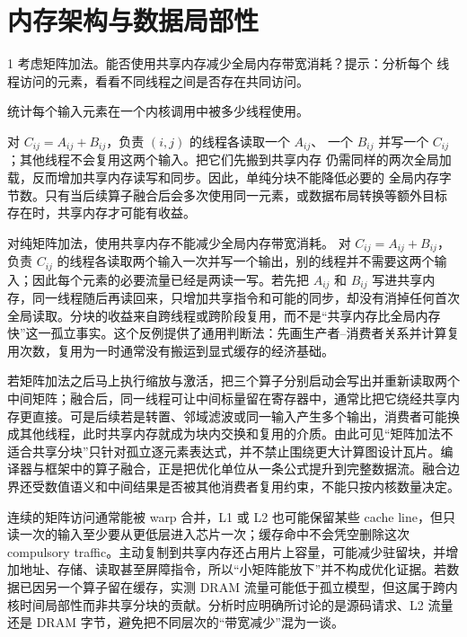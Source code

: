 \chapter{内存架构与数据局部性}

\begin{solutionexercise}{1}
\problemheading 考虑矩阵加法。能否使用共享内存减少全局内存带宽消耗？提示：分析每个
线程访问的元素，看看不同线程之间是否存在共同访问。

\approachheading 统计每个输入元素在一个内核调用中被多少线程使用。

\answerheading 对 $C_{ij}=A_{ij}+B_{ij}$，负责 $(i,j)$ 的线程各读取一个 $A_{ij}$、
一个 $B_{ij}$ 并写一个 $C_{ij}$；其他线程不会复用这两个输入。把它们先搬到共享内存
仍需同样的两次全局加载，反而增加共享内存读写和同步。因此，单纯分块不能降低必要的
全局内存字节数。只有当后续算子融合后会多次使用同一元素，或数据布局转换等额外目标
存在时，共享内存才可能有收益。

\conclusionheading 对纯矩阵加法，使用共享内存不能减少全局内存带宽消耗。
\discussionheading
{}
对 $C_{ij}=A_{ij}+B_{ij}$，负责 $C_{ij}$ 的线程各读取两个输入一次并写一个输出，别的线程并不需要这两个输入；因此每个元素的必要流量已经是两读一写。若先把 $A_{ij}$ 和 $B_{ij}$ 写进共享内存，同一线程随后再读回来，只增加共享指令和可能的同步，却没有消掉任何首次全局读取。分块的收益来自跨线程或跨阶段复用，而不是“共享内存比全局内存快”这一孤立事实。这个反例提供了通用判断法：先画生产者--消费者关系并计算复用次数，复用为一时通常没有搬运到显式缓存的经济基础。

若矩阵加法之后马上执行缩放与激活，把三个算子分别启动会写出并重新读取两个中间矩阵；融合后，同一线程可让中间标量留在寄存器中，通常比把它绕经共享内存更直接。可是后续若是转置、邻域滤波或同一输入产生多个输出，消费者可能换成其他线程，此时共享内存就成为块内交换和复用的介质。由此可见“矩阵加法不适合共享分块”只针对孤立逐元素表达式，并不禁止围绕更大计算图设计瓦片。编译器与框架中的算子融合，正是把优化单位从一条公式提升到完整数据流。融合边界还受数值语义和中间结果是否被其他消费者复用约束，不能只按内核数量决定。

连续的矩阵访问通常能被 warp 合并，L1 或 L2 也可能保留某些 cache line，但只读一次的输入至少要从更低层进入芯片一次；缓存命中不会凭空删除这次 compulsory traffic。主动复制到共享内存还占用片上容量，可能减少驻留块，并增加地址、存储、读取甚至屏障指令，所以“小矩阵能放下”并不构成优化证据。若数据已因另一个算子留在缓存，实测 DRAM 流量可能低于孤立模型，但这属于跨内核时间局部性而非共享分块的贡献。分析时应明确所讨论的是源码请求、L2 流量还是 DRAM 字节，避免把不同层次的“带宽减少”混为一谈。


\end{solutionexercise}
